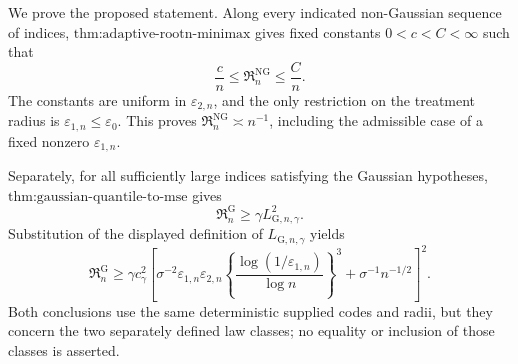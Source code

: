 We prove the proposed statement.  Along every indicated non-Gaussian sequence of indices, \(\text{thm:adaptive-rootn-minimax}\) gives fixed constants \(0<c<C<\infty\) such that
\[
 \frac cn\le\mathfrak R_n^{\mathrm{NG}}\le\frac Cn.
\]
The constants are uniform in \(\varepsilon_{2,n}\), and the only restriction on the treatment radius is \(\varepsilon_{1,n}\le\varepsilon_0\).  This proves \(\mathfrak R_n^{\mathrm{NG}}\asymp n^{-1}\), including the admissible case of a fixed nonzero \(\varepsilon_{1,n}\).

Separately, for all sufficiently large indices satisfying the Gaussian hypotheses, \(\text{thm:gaussian-quantile-to-mse}\) gives
\[
 \mathfrak R_n^{\mathrm G}\ge\gamma L_{\mathrm G,n,\gamma}^2.
\]
Substitution of the displayed definition of \(L_{\mathrm G,n,\gamma}\) yields
\[
 \mathfrak R_n^{\mathrm G}\ge
 \gamma c_{\gamma}^2\left[
 \sigma^{-2}\varepsilon_{1,n}\varepsilon_{2,n}
 \left\{\frac{\log(1/\varepsilon_{1,n})}{\log n}\right\}^{3}
 +\sigma^{-1}n^{-1/2}\right]^2.
\]
Both conclusions use the same deterministic supplied codes and radii, but they concern the two separately defined law classes; no equality or inclusion of those classes is asserted.